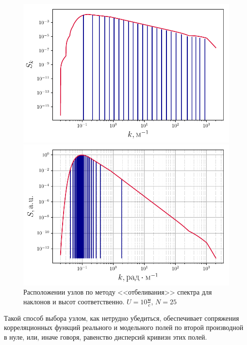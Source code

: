 \begin{figure}[H]
	\begin{minipage}{0.49\linewidth}
			\centering
			\includegraphics[width=\linewidth]{fig/split_slopes}	
	\end{minipage}
	\hfill
	\begin{minipage}{0.49\linewidth}
			\centering
			\includegraphics[width=\linewidth]{fig/split_height}
	\end{minipage}
	\caption{Расположении узлов по методу <<отбеливания>> спектра  для наклонов и высот соответственно. $U=10 \frac{\text{м}}{c}$, $N=25$}
	\label{fig:splits}		
\end{figure}


Такой способ выбора узлом, как нетрудно убедиться, обеспечивает сопряжения корреляционных функций реального и модельного полей по второй производной в нуле, или, иначе говоря, равенство дисперсий кривизн этих полей. 




